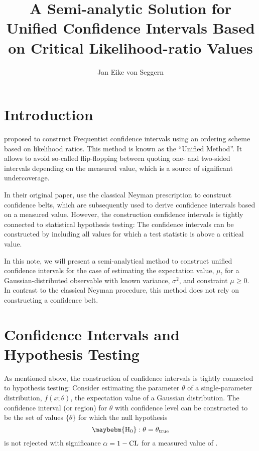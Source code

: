 \documentclass[a4paper]{article}
\title{A Semi-analytic Solution for Unified Confidence Intervals Based
on Critical Likelihood-ratio Values}
\author{Jan Eike von Seggern}
\newcommand*\Hnull{\maybebm{\mathrm{H}_0}\xspace}
\newcommand*\xm{\maybebm{x_{\mathrm{m}}}\xspace}
\begin{document}
\maketitle

\section{Introduction}

\textcite{Feldman1998} proposed to construct Frequentist confidence
intervals
using an ordering scheme based on likelihood ratios. This method is
known as the ``Unified Method''. It allows to avoid so-called
flip-flopping between quoting one- and two-sided intervals depending on
the measured value, which is a source of significant undercoverage.

In their original paper, \citeauthor{Feldman1998} use the classical
Neyman prescription to construct confidence belts, which are
subsequently used to derive confidence intervals based on a measured
value. However, the construction confidence intervals is tightly
connected to statistical hypothesis
testing\cite{wiki:confidenceinterval,Cox1974}: The confidence intervals
can be constructed by including all values for which a test statistic is
above a critical value\cite{Sen2009}.

In this note, we will present a semi-analytical method to construct
unified confidence intervals for the case of estimating the expectation
value, $\mu$, for a Gaussian-distributed observable with known variance,
$\sigma^2$, and constraint $\mu \geq 0$. In contrast to the classical
Neyman procedure, this method does not rely on constructing a confidence
belt.

\section{Confidence Intervals and Hypothesis Testing}

As mentioned above, the construction of confidence intervals is tightly
connected to hypothesis testing: Consider estimating the parameter
$\theta$ of a single-parameter distribution, $f(x; \theta)$, \eg the expectation value
of a Gaussian distribution. The confidence interval (or region) for
$\theta$ with confidence level \CL can be constructed to be
the set of values $\{\theta\}$ for which the null hypothesis
%
\begin{equation*}
  \Hnull: \theta = \theta_\mathrm{true}
\end{equation*}
%
is not rejected with significance $\alpha = 1- \mathrm{CL}$ for a measured value
of \xm.
\end{document}
